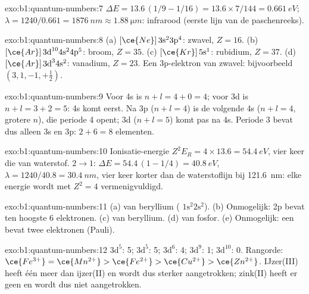 \begin{solution}{exo:b1:quantum-numbers:7}
$\Delta E = 13.6\,(1/9 - 1/16) = 13.6 \times 7/144 = \qty{0.661}{eV}$;
$\lambda = 1240/0.661 = \qty{1876}{nm} \approx \qty{1.88}{\micro m}$:
infrarood (eerste lijn van de paschenreeks).
\end{solution}

\begin{solution}{exo:b1:quantum-numbers:8}
(a) $[\ce{Ne}]\,3\text{s}^2 3\text{p}^4$: zwavel, $Z = 16$.
(b) $[\ce{Ar}]\,3\text{d}^{10} 4\text{s}^2 4\text{p}^5$: broom, $Z = 35$.
(c) $[\ce{Kr}]\,5\text{s}^1$: rubidium, $Z = 37$.
(d) $[\ce{Ar}]\,3\text{d}^3 4\text{s}^2$: vanadium, $Z = 23$.
Een 3p-elektron van zwavel: bijvoorbeeld $(3, 1, -1, +\tfrac12)$.
\end{solution}


\begin{solution}{exo:b1:quantum-numbers:9}
Voor 4s is $n + l = 4 + 0 = 4$; voor 3d is $n + l = 3 + 2 = 5$: 4s komt
eerst. Na 3p ($n + l = 4$) is de volgende  4s ($n + l = 4$,
grotere $n$), die periode 4 opent; 3d ($n + l = 5$) komt pas na 4s.
Periode 3 bevat dus alleen 3s en 3p: $2 + 6 = 8$ elementen.
\end{solution}

\begin{solution}{exo:b1:quantum-numbers:10}
Ionisatie-energie $Z^2E_R = 4 \times 13.6 = \qty{54.4}{eV}$, vier keer
die van waterstof. $2 \to 1$: $\Delta E = 54.4\,(1 - 1/4) = \qty{40.8}{eV}$,
$\lambda = 1240/40.8 = \qty{30.4}{nm}$, vier keer korter dan de
waterstoflijn bij \qty{121.6}{nm}: elke energie wordt met $Z^2 = 4$
vermenigvuldigd.
\end{solution}

\begin{solution}{exo:b1:quantum-numbers:11}
(a)  van beryllium ( $1\text{s}^2 2\text{s}^2$).
(b) Onmogelijk: 2p bevat ten hoogste 6 elektronen. (c)  van beryllium. (d)  van fosfor. (e) Onmogelijk: een
 bevat twee elektronen (Pauli).
\end{solution}

\begin{solution}{exo:b1:quantum-numbers:12}
 $3\text{d}^5$: 5;  $3\text{d}^5$: 5; 
$3\text{d}^6$: 4;  $3\text{d}^9$: 1; 
$3\text{d}^{10}$: 0. Rangorde: $\ce{Fe^{3+}} = \ce{Mn^{2+}} > \ce{Fe^{2+}}
> \ce{Cu^{2+}} > \ce{Zn^{2+}}$. IJzer(III) heeft één 
meer dan ijzer(II) en wordt dus sterker aangetrokken; zink(II) heeft er
geen en wordt dus niet aangetrokken.
\end{solution}

